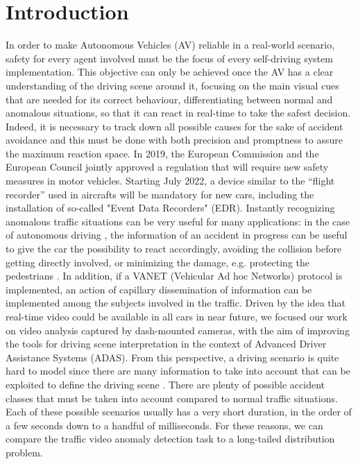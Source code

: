 \section{Introduction}

In order to make Autonomous Vehicles (AV) reliable in a real-world scenario, safety for every agent involved must be the focus of every self-driving system implementation.
This objective can only be achieved once the AV has a clear understanding of the driving scene around it, focusing on the main visual cues that are needed for its correct behaviour, differentiating between normal and anomalous situations, so that it can react in real-time to take the safest decision.
Indeed, it is necessary to track down all possible causes for the sake of accident avoidance and this must be done with both precision and promptness to assure the maximum reaction space.
In 2019, the European Commission and the European Council jointly approved a regulation that will require new safety measures in motor vehicles.
Starting July 2022, a device similar to the ``flight recorder'' used in aircrafts will be mandatory for new cars, including the installation of so-called "Event Data Recorders" (EDR).
Instantly recognizing anomalous traffic situations can be very useful for many applications:
in the case of autonomous driving \cite{codevilla2019exploring}, the information of an accident in progress can be useful to give the car the possibility to react accordingly, avoiding the collision before getting directly involved, or minimizing the damage, e.g. protecting the pedestrians \cite{4298901}.
In addition, if a VANET (Vehicular Ad hoc Networks) protocol \cite{fatemidokht2021efficient} is implemented, an action of capillary dissemination of information can be implemented among the subjects involved in the traffic.
Driven by the idea that real-time video could be available in all cars in near future, we focused our work on video analysis captured by dash-mounted cameras, with the aim of improving the tools for driving scene interpretation in the context of Advanced Driver Assistance Systems (ADAS).
From this perspective, a driving scenario is quite hard to model since there are many information to take into account that can be exploited to define the driving scene  .
There are plenty of possible accident classes that must be taken into account compared to normal traffic situations.
Each of these possible scenarios usually has a very short duration, in the order of a few seconds down to a handful of milliseconds.
For these reasons, we can compare the traffic video anomaly detection task to a long-tailed distribution problem.
